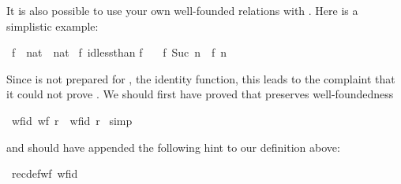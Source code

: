 \begin{isabellebody}
\begin{isamarkuptext}
It is also possible to use your own well-founded relations with .
Here is a simplistic example:%
\end{isamarkuptext}%
\ f\ {\isacharcolon}{\isacharcolon}\ {\isachardoublequote}nat\ {\isasymRightarrow}\ nat{\isachardoublequote}\isanewline
{}\ f\ {\isachardoublequote}id{\isacharparenleft}less{\isacharunderscore}than{\isacharparenright}{\isachardoublequote}\isanewline
{\isachardoublequote}f\ {}\ {\isacharequal}\ {}{\isachardoublequote}\isanewline
{\isachardoublequote}f\ {\isacharparenleft}Suc\ n{\isacharparenright}\ {\isacharequal}\ f\ n{\isachardoublequote}%
\begin{isamarkuptext}%
\noindent
Since  is not prepared for , the identity
function, this leads to the complaint that it could not prove
.
We should first have proved that  preserves well-foundedness%
\end{isamarkuptext}%
\ wf{\isacharunderscore}id{\isacharcolon}\ {\isachardoublequote}wf\ r\ {\isasymLongrightarrow}\ wf{\isacharparenleft}id\ r{\isacharparenright}{\isachardoublequote}\isanewline
{}\ simp%
\begin{isamarkuptext}%
\noindent
and should have appended the following hint to our definition above:
%
\end{isamarkuptext}%
{\isacharparenleft}\ recdef{\isacharunderscore}wf{\isacharcolon}\ wf{\isacharunderscore}id{\isacharparenright}\end{isabellebody}%
